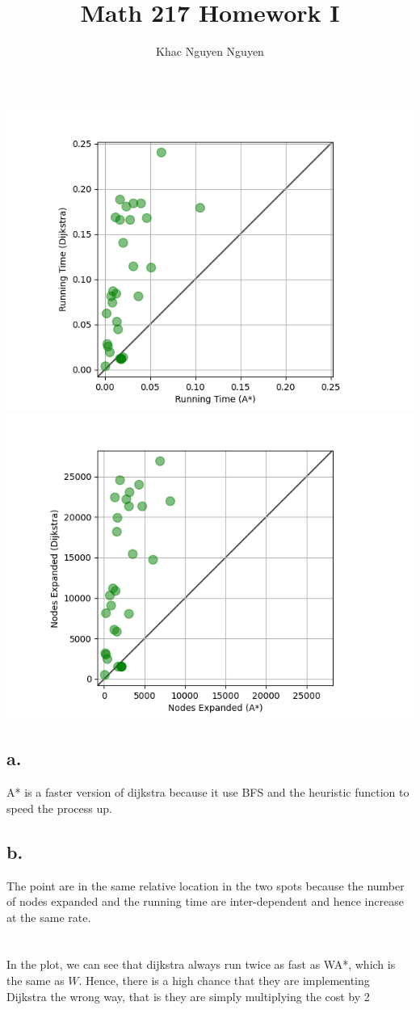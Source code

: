 \documentclass[11pt]{article}
\title{\textbf{Math 217 Homework I}}
\author{Khac Nguyen Nguyen}
\date{}
\begin{document}
\section{}
\includegraphics[scale = 0.8]{running_time.png}
\includegraphics[scale = 0.8]{nodes_expanded.png}
\subsection*{a.}
A* is a faster version of dijkstra because it use 
BFS and the heuristic function to speed the process up. \\
\subsection*{b.}
The point are in the same relative location in the two spots 
because the number of nodes expanded and the running time are inter-dependent 
and hence increase at the same rate.
\section{}
In the plot, we can see that dijkstra always run twice as fast as WA*, which is the same as $W$.
Hence, there is a high chance that they are implementing Dijkstra the wrong way, 
that is they are simply multiplying the cost by 2
\end{document}

